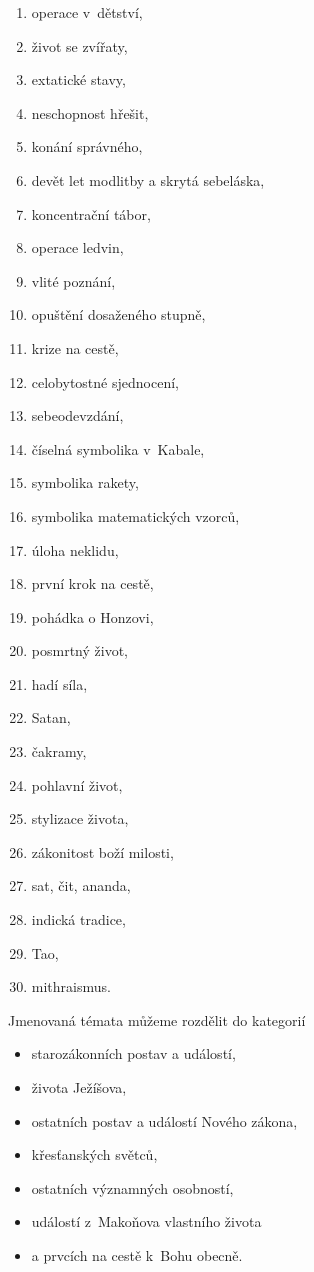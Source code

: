 \begin{enumerate}
\item{operace v~dětství,}
\item{život se zvířaty,}
\item{extatické stavy,}
\item{neschopnost hřešit,}
\item{konání správného,}
\item{devět let modlitby a skrytá sebeláska,}
\item{koncentrační tábor,}
\item{operace ledvin,}
\item{vlité poznání,}

\item{opuštění dosaženého stupně,}
\item{krize na cestě,}
\item{celobytostné sjednocení,}
\item{sebeodevzdání,}
\item{číselná symbolika v~Kabale,}
\item{symbolika rakety,}
\item{symbolika matematických vzorců,}
\item{úloha neklidu,}
\item{první krok na cestě,}
\item{pohádka o Honzovi,}
\item{posmrtný život,}
\item{hadí síla,}
\item{Satan,}
\item{čakramy,}
\item{pohlavní život,}
\item{stylizace života,}
\item{zákonitost boží milosti,}
\item{sat, čit, ananda,}
\item{indická tradice,}
\item{Tao,}
\item{mithraismus.}

\end{enumerate}

Jmenovaná témata můžeme rozdělit do kategorií
\begin{itemize}
\item{starozákonních postav a událostí,}
\item{života Ježíšova,}
\item{ostatních postav a událostí Nového zákona,}
\item{křesťanských světců,}
\item{ostatních významných osobností,}
\item{událostí z~Makoňova vlastního života}
\item{a prvcích na cestě k~Bohu obecně.}
\end{itemize}

